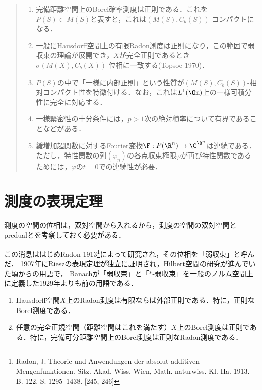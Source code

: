 \documentclass[uplatex,dvipdfmx]{jsreport}
\begin{document}
\begin{quotation}\mbox{}
    \begin{enumerate}
        \item 完備距離空間上のBorel確率測度は正則である．これを$P(S)\subset M(S)$と表すと，これは$(M(S),C_b(S))$-コンパクトになる．
        \item 一般にHausdorff空間上の有限Radon測度は正則になり，この範囲で弱収束の理論が展開でき，$X$が完全正則であるとき$\sigma(M(X),C_b(X))$-位相に一致する(Topsoe 1970)．
        \item $P(S)$の中で「一様に内部正則」という性質が$(M(S),C_b(S))$-相対コンパクト性を特徴付ける．なお，これは$L^1(\Om)$上の一様可積分性に完全に対応する．
        \item 一様緊密性の十分条件には，$p>1$次の絶対積率について有界であることなどがある．
        \item 緩増加超関数に対するFourier変換$\F:P(\R^n)\to\C^{\R^n}$は連続である．ただし，特性関数の列$(\varphi_n)$の各点収束極限$\varphi$が再び特性関数であるためには，$\varphi$の$t=0$での連続性が必要．
    \end{enumerate}
\end{quotation}

\section{測度の表現定理}

\begin{tcolorbox}[colframe=ForestGreen, colback=ForestGreen!10!white,breakable,colbacktitle=ForestGreen!40!white,coltitle=black,fonttitle=\bfseries\sffamily,
    title=測度の双対空間と前双対空間]
    測度の空間の位相は，双対空間から入れるから，測度の空間の双対空間とpredualとを考察しておく必要がある．

    この消息ははじめRadon 1913\footnote{Radon, J. Theorie und Anwendungen der absolut additiven Mengenfunktionen. Sitz. Akad.
    Wiss. Wien, Math.-naturwiss. Kl. IIa. 1913. B. 122. S. 1295–1438. [245, 246]}によって研究され，その位相を「弱収束」と呼んだ．
    1907年にRieszの表現定理が独立に証明され，Hilbert空間の研究が進んでいた頃からの用語で，
    Banachが「弱収束」と「$*$-弱収束」を一般のノルム空間上に定義した1929年よりも前の用語である．
\end{tcolorbox}

\begin{theorem}[Borel測度の正則性についての結果]\mbox{}
    \begin{enumerate}
        \item Hausdorff空間$X$上のRadon測度は有限ならば外部正則である．特に，正則なBorel測度である．
        \item 任意の完全正規空間（距離空間はこれを満たす）$X$上のBorel測度は正則である．特に，完備可分距離空間上のBorel測度は正則なRadon測度である．
    \end{enumerate}
\end{theorem}
\end{document}
